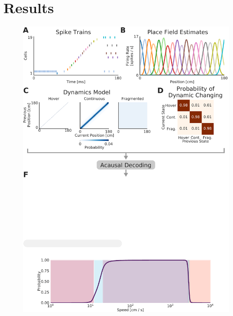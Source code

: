 \documentclass[times, twoside]{zHenriquesLab-StyleBioRxiv}
\begin{document}
\section*{Results}
\begin{figure}%
\centering
\includegraphics[width=0.80\linewidth]{figures/Figure1/Figure1_v3}

\end{figure}
\end{document}
